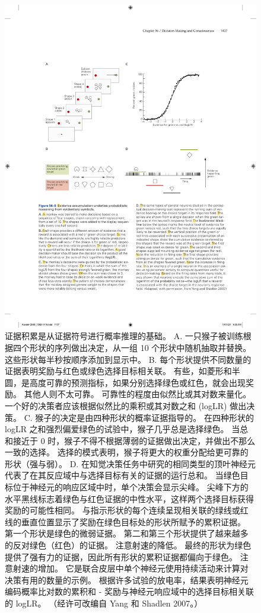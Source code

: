\begin{figure}[htbp]
	\centering
	\includegraphics[width=0.85\linewidth]{chap56/fig_56_9}
	\caption{证据积累是从证据符号进行概率推理的基础。 A. 一只猴子被训练根据四个形状的序列做出决定，从一组 10 个形状中随机抽取并替换。这些形状每半秒按顺序添加到显示中。 B. 每个形状提供不同数量的证据表明奖励与红色或绿色选择目标相关联。 有些，如菱形和半圆，是高度可靠的预测指标，如果分别选择绿色或红色，就会出现奖励。 其他人则不太可靠。 可靠性的程度由似然比或其对数来量化。 一个好的决策者应该根据似然比的乘积或其对数之和 (logLR) 做出决策。 C. 猴子的决定是由四种形状的概率证据指导的。 在四种形状的 logLR 之和强烈偏爱绿色的试验中，猴子几乎总是选择绿色。 当总和接近于 0 时，猴子不得不根据薄弱的证据做出决定，并做出不那么一致的选择。 选择的模式表明，猴子将更大的权重分配给更可靠的形状（强与弱）。 D. 在知觉决策任务中研究的相同类型的顶叶神经元代表了在其反应域中与选择目标有关的证据的运行总和。 当绿色目标位于神经元的响应区域中时，单个决策会显示尖峰。 尖峰下方的水平黑线标志着绿色与红色证据的中性水平，这样两个选择目标获得奖励的可能性相同。 与指示形状的每个连续呈现相关联的绿线或红线的垂直位置显示了奖励在绿色目标处的形状所赋予的累积证据。 第一个形状是绿色的微弱证据。 第二和第三个形状提供了越来越多的反对绿色（红色）的证据。 注意射速的降低。 最终的形状为绿色提供了强有力的证据，因此所有形状的累积证据都偏向于绿色。 注意射速的增加。 它是联合皮层中单个神经元使用持续活动来计算对决策有用的数量的示例。 根据许多试验的放电率，结果表明神经元编码概率比对数的累积和 - 奖励与神经元响应域中的选择目标相关联的 logLR。 （经许可改编自 Yang 和 Shadlen 2007。）}
	\label{fig:56_9}
\end{figure}


